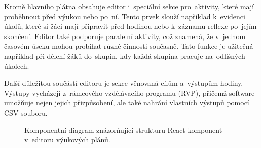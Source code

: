 \documentclass[male,czech,api_bc]{kitheses}
\begin{document}
Kromě hlavního plátna obsahuje editor i~speciální sekce pro~aktivity, které mají proběhnout před výukou nebo po~ní. Tento prvek slouží například k~evidenci úkolů, které si žáci mají připravit před hodinou nebo k~záznamu reflexe po~jejím skončení. Editor také podporuje paralelní aktivity, což znamená, že v~jednom časovém úseku mohou probíhat různé činnosti současně. Tato funkce je užitečná například při dělení žáků do~skupin, kdy každá skupina pracuje na~odlišných úkolech.

Další důležitou součástí editoru je sekce věnovaná cílům a~výstupům hodiny. Výstupy vycházejí z~rámcového vzdělávacího programu (RVP), přičemž software umožňuje nejen jejich přizpůsobení, ale také nahrání vlastních výstupů pomocí CSV souboru.

\begin{figure}[H]
	\centering
	\caption{Komponentní diagram znázorňující strukturu React komponent v~editoru výukových plánů.}
	\label{fig:component-diagram-react-1}
\end{figure}
\end{document}
